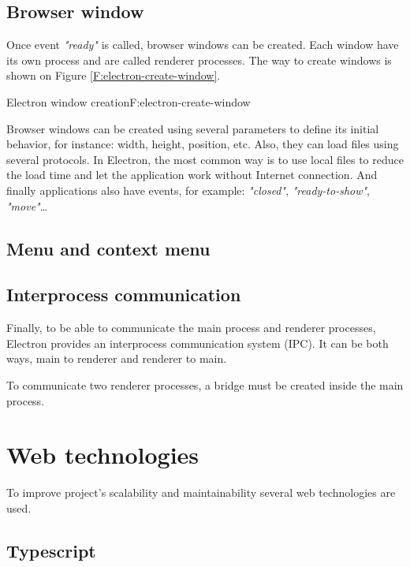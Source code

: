 \subsection{Browser window}

Once event \textit{"ready"} is called, browser windows can be created. Each
window have its own process and are called renderer processes. The way to
create windows is shown on Figure \ref{F:electron-create-window}.

\begin{codefigure}{Electron window creation}{F:electron-create-window}
\end{codefigure}

Browser windows can be created using several parameters to define its initial
behavior, for instance: width, height, position, etc. Also, they can load files 
using several protocols. In Electron, the most common way is to use local files
to reduce the load time and let the application work without Internet 
connection. And finally applications also have events, for example: 
\textit{"closed"}, \textit{"ready-to-show"}, \textit{"move"}\dots

\subsection{Menu and context menu}


\subsection{Interprocess communication}

Finally, to be able to communicate the main process and renderer processes, 
Electron provides an interprocess communication system (IPC). It can be both
ways, main to renderer and renderer to main.

To communicate two renderer processes, a bridge must be created inside the 
main process.

\section{Web technologies}

To improve project's scalability and maintainability several web technologies
are used.

\subsection{Typescript}


